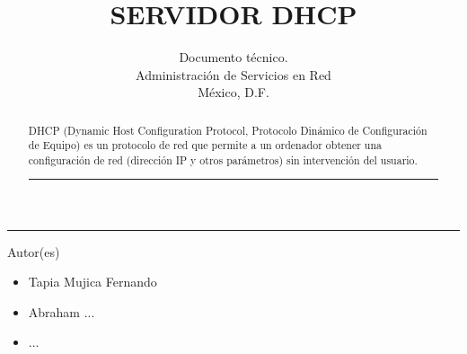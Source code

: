 \title{SERVIDOR DHCP}
\author{Documento técnico.\\
\small Administración de Servicios en Red\\
\small México, D.F.
}

\vspace{2cm}
\maketitle		
	\vspace*{-1cm}
	\begin{center}\rule{0.9\textwidth}{0.1mm}\end{center}
	\begin{abstract}
	\normalsize DHCP (Dynamic Host Configuration Protocol, Protocolo Dinámico de Configuración de Equipo) es un protocolo de red que permite a un ordenador obtener una configuración de red (dirección IP y otros parámetros) sin intervención del usuario.
	\begin{center}\rule{0.9\textwidth}{0.1mm}\end{center}
	\vspace*{0.5cm}
	\end{abstract}
	\vspace*{9cm}
\small Autor(es)
\begin{itemize}
	\item Tapia Mujica Fernando
	\item  Abraham ...
	\item ...
\end{itemize}